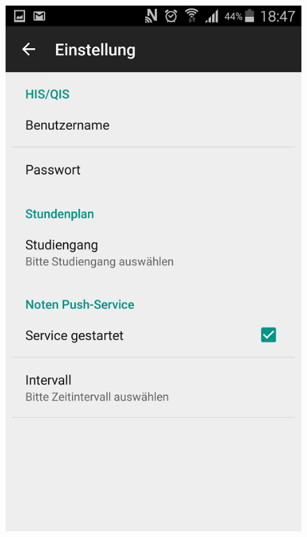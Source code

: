 \begin{figure}[htb]
    \centering
    \begin{minipage}{0.45\linewidth}
        \centering
        \includegraphics[scale=0.5]{03_Bedienungsanleitung/img/einstellungen.png}
    \end{minipage}
    \begin{minipage}{0.45\linewidth}
        \centering

\end{minipage}
\end{figure}
